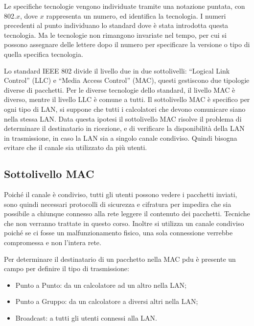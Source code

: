 \documentclass{article}
\numberwithin{equation}{subsection}
\begin{document}
Le specifiche tecnologie vengono individuate tramite una notazione puntata, con 802.$x$, dove $x$ rappresenta un numero, ed identifica la tecnologia. I numeri precedenti al punto individuano lo standard dove è 
stata introdotta questa tecnologia. Ma le tecnologie non rimangono invariate nel tempo, per cui si possono assegnare delle lettere dopo il numero per specificare la versione o tipo di quella specifica tecnologia. 

Lo standard IEEE 802 divide il livello due in due sottolivelli: ``Logical Link Control'' (LLC) e ``Media Access Control'' (MAC), questi gestiscono due tipologie diverse di pacchetti. Per le diverse tecnologie dello standard, il livello MAC è diverso, mentre il livello 
LLC è comune a tutti. 
Il sottolivello MAC è specifico per ogni tipo di LAN, si suppone che tutti i calcolatori che devono comunicare siano nella stessa LAN. Data questa ipotesi il sottolivello MAC risolve il problema di determinare 
il destinatario in ricezione, e di verificare la disponibilità della LAN in trasmissione, in caso la LAN sia a singolo canale condiviso. Quindi bisogna evitare che il canale sia utilizzato da più utenti. 

\subsection{Sottolivello MAC}

Poiché il canale è condiviso, tutti gli utenti possono vedere i pacchetti inviati, sono quindi necessari protocolli di sicurezza e cifratura per impedira che sia possibile a chiunque connesso alla rete leggere il 
contenuto dei pacchetti. Tecniche che non verranno trattate in questo corso. 
Inoltre si utilizza un canale condiviso poiché se ci fosse un malfunzionamento fisico, una sola connessione verrebbe compromessa e non l'intera rete. 

Per determinare il destinatario di un pacchetto nella MAC pdu è presente un campo per definire il tipo di trasmissione:
\begin{itemize}
  \item Punto a Punto: da un calcolatore ad un altro nella LAN;
  \item Punto a Gruppo: da un calcolatore a diversi altri nella LAN;
  \item Broadcast: a tutti gli utenti connessi alla LAN. 
\end{itemize}
\end{document}
